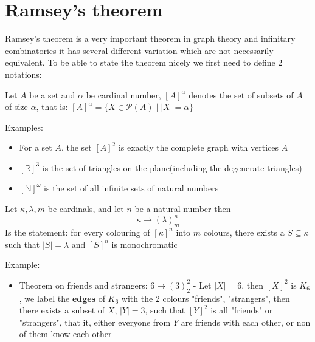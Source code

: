 	\section[Ramsey's theorem]{Ramsey's theorem}
	\begin{frame}
		Ramsey's theorem is a very important theorem in graph theory and infinitary combinatorics it has several different variation which are not necessarily equivalent.\pause\newline
		To be able to state the theorem nicely we first need to define 2 notations:
	\end{frame}
	\begin{frame}
		\begin{definition}
			Let $A$ be a set and $\alpha$ be cardinal number, $[A]^\alpha$ denotes the set of subsets of $A$ of size $\alpha$, that is: $[A]^\alpha=\{X\in\mathcal{P}(A)\mid |X|=\alpha\}$
		\end{definition}\pause
		Examples:\pause
		\begin{itemize}
			\item For a set $A$, the set $[A]^2$ is exactly the complete graph with vertices $A$\pause
			\item $[\mathbb{R}]^3$ is the set of triangles on the plane(including the degenerate triangles)\pause
			\item $[\mathbb{N}]^\omega$ is the set of all infinite sets of natural numbers
		\end{itemize}
	\end{frame}
	\begin{frame}
		\begin{definition}
			Let $\kappa,\lambda,m$ be cardinals, and let $n$ be a natural number then $$\kappa\to(\lambda)^n_m$$ Is the statement: for every colouring of $[\kappa]^n$ into $m$ colours, there exists a $S\subseteq \kappa$ such that $|S|=\lambda$ and $[S]^n$ is monochromatic 
		\end{definition}\pause
		Example:
		\begin{itemize}
			\item Theorem on friends and strangers: $6\to(3)^2_2$ - Let $|X|=6$, then $[X]^2$ is $K_6$, we label the \textbf{edges} of $K_6$ with the 2 colours "friends", "strangers", then there exists a subset of $X$, $|Y|=3$, such that $[Y]^2$ is all "friends" or "strangers", that it, either everyone from $Y$ are friends with each other, or non of them know each other
		\end{itemize}
	\end{frame}
